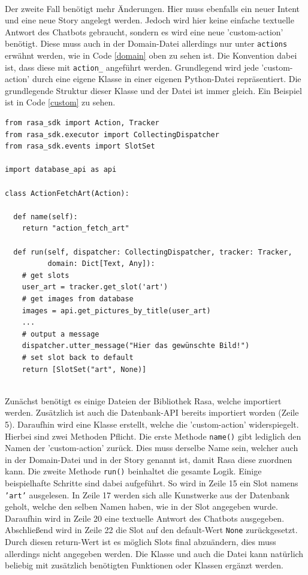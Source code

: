 \\
Der zweite Fall benötigt mehr Änderungen. Hier muss ebenfalls ein neuer Intent und eine neue Story angelegt werden. Jedoch wird hier keine einfache textuelle Antwort des Chatbots gebraucht, sondern es wird eine neue 'custom-action' benötigt. Diese muss auch in der Domain-Datei allerdings nur unter \texttt{actions} erwähnt werden, wie in Code \ref{domain} oben zu sehen ist. Die Konvention dabei ist, dass diese mit \texttt{action\_} angeführt werden. Grundlegend wird jede 'custom-action' durch eine eigene Klasse in einer eigenen Python-Datei repräsentiert. Die grundlegende Struktur dieser Klasse und der Datei ist immer gleich. Ein Beispiel ist in Code \ref{custom} zu sehen.
\begin{lstlisting}[caption={Beispiel für den Aufbau einer 'custom-action'.}, label=custom, lineskip=1pt,showlines=true]
from rasa_sdk import Action, Tracker
from rasa_sdk.executor import CollectingDispatcher
from rasa_sdk.events import SlotSet

import database_api as api

class ActionFetchArt(Action):

  def name(self):
    return "action_fetch_art"

  def run(self, dispatcher: CollectingDispatcher, tracker: Tracker, 
          domain: Dict[Text, Any]):
    # get slots
    user_art = tracker.get_slot('art')
    # get images from database
    images = api.get_pictures_by_title(user_art)
	...
    # output a message
    dispatcher.utter_message("Hier das gewünschte Bild!")
    # set slot back to default
    return [SlotSet("art", None)]
    
\end{lstlisting}
Zunächst benötigt es einige Dateien der Bibliothek Rasa, welche importiert werden. Zusätzlich ist auch die Datenbank-API bereits importiert worden (Zeile 5). Daraufhin wird eine Klasse erstellt, welche die 'custom-action' widerspiegelt. Hierbei sind zwei Methoden Pflicht. Die erste Methode \texttt{name()} gibt lediglich den Namen der 'custom-action' zurück. Dies muss derselbe Name sein, welcher auch in der Domain-Datei und in der Story genannt ist, damit Rasa diese zuordnen kann. Die zweite Methode \texttt{run()} beinhaltet die gesamte Logik. Einige beispielhafte Schritte sind dabei aufgeführt. So wird in Zeile 15 ein Slot namens \texttt{'art'} ausgelesen. In Zeile 17 werden sich alle Kunstwerke aus der Datenbank geholt, welche den selben Namen haben, wie in der Slot angegeben wurde. Daraufhin wird in Zeile 20 eine textuelle Antwort des Chatbots ausgegeben. Abschließend wird in Zeile 22 die Slot auf den default-Wert \texttt{None} zurückgesetzt. Durch diesen return-Wert ist es möglich Slots final abzuändern, dies muss allerdings nicht angegeben werden. Die Klasse und auch die Datei kann natürlich beliebig mit zusätzlich benötigten Funktionen oder Klassen ergänzt werden.\\

